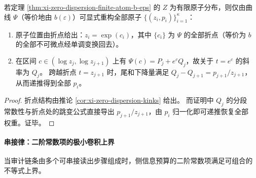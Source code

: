 \begin{corollary}\label{cor:xi-zero-dispersion-finite-atom-reconstruction}
若定理 \ref{thm:xi-zero-dispersion-finite-atom-b-eps} 的 \(Z\) 为有限原子分布，则仅由曲线 \(\Psi\)（等价地由 \(b(\varepsilon)\)）可显式重构全部原子 \(\{(z_i,p_i)\}_{i=1}^{\kappa}\)：
\begin{enumerate}
  \item 原子位置由折点给出：\(z_i=\exp(c_i)\)，其中 \(\{c_i\}\) 为 \(\Psi\) 的全部折点（等价为 \(b\) 的全部不可微点经单调变换回去）。
  \item 在区间 \(c\in(\log z_j,\log z_{j+1})\) 上有 \(\Psi(c)=P_j+e^cQ_j\)，故关于 \(t=e^c\) 的斜率为 \(Q_j\)。
        跨越折点 \(t=z_{j+1}\) 时，尾和下降量满足 \(Q_j-Q_{j+1}=p_{j+1}/z_{j+1}\)，从而递推得到全部 \(p_i\)。
\end{enumerate}
\end{corollary}
\begin{proof}
折点结构由推论 \ref{cor:xi-zero-dispersion-kinks} 给出。
而证明中 \(Q_j\) 的分段常数性与折点处的跳变公式直接导出 \(p_{j+1}/z_{j+1}\)，由 \(p_i\) 归一化即可递推恢复全部权重。证毕。
\end{proof}

\paragraph{串接律：二阶常数项的极小卷积上界}
当审计链条由多个可串接读出步骤组成时，侧信息预算的二阶常数项满足可组合的不等式上界。

